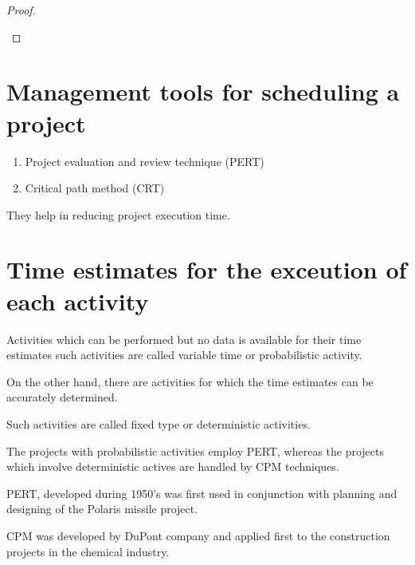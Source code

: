 \documentclass[oneside,11pt,pdftex]{book}%
\numberwithin{equation}{section}
\numberwithin{section}{chapter}
\numberwithin{equation}{chapter}
\begin{document}
\begin{proof}
\begin{center}
		
	\end{center}
\end{proof}
\section{Management tools for scheduling a project}
\begin{enumerate}
	\item Project evaluation and review technique (PERT)
	\item Critical path method (CRT)
\end{enumerate}
They help in reducing project execution time.
\section{Time estimates for the exceution of each activity}

Activities which can be performed but no data is available for their time estimates such activities are called variable time or probabilistic activity.
\par On the other hand, there are activities for which the time estimates can be accurately determined.
\par Such activities are called fixed type or deterministic activities. 
\par The projects with probabilistic activities employ PERT, whereas the projects which involve deterministic actives are handled by CPM techniques.
\par PERT, developed during 1950's was first used in conjunction with planning and designing of the Polaris missile project.
\par CPM was developed by DuPont company and applied first to the construction projects in the chemical industry.
\end{document}
